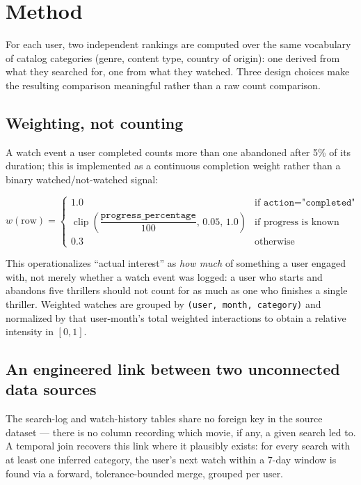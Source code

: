 \documentclass[11pt,a4paper,oneside]{book}
\newcommand{\code}[1]{\texttt{#1}}
\begin{document}
\section{Method}
\label{sec:behavior-method}

For each user, two independent rankings are computed over the same vocabulary of catalog categories
(genre, content type, country of origin): one derived from what they searched for, one from what
they watched. Three design choices make the resulting comparison meaningful rather than a raw
count comparison.

\subsection{Weighting, not counting}

A watch event a user completed counts more than one abandoned after 5\% of its duration; this is
implemented as a continuous completion weight rather than a binary watched/not-watched signal:

\[
w(\text{row}) =
\begin{cases}
1.0 & \text{if } \code{action} = \code{"completed"} \\[4pt]
\operatorname{clip}\!\left(\dfrac{\code{progress\_percentage}}{100},\, 0.05,\, 1.0\right) &
    \text{if progress is known} \\[8pt]
0.3 & \text{otherwise}
\end{cases}
\]

This operationalizes ``actual interest'' as \emph{how much} of something a user engaged with, not
merely whether a watch event was logged: a user who starts and abandons five thrillers should not
count for as much as one who finishes a single thriller. Weighted watches are grouped by
\code{(user, month, category)} and normalized by that user-month's total weighted interactions to
obtain a relative intensity in $[0,1]$.

\subsection{An engineered link between two unconnected data sources}
\label{sec:behavior-link}

The search-log and watch-history tables share no foreign key in the source dataset --- there is no
column recording which movie, if any, a given search led to. A temporal join recovers this link
where it plausibly exists: for every search with at least one inferred category, the user's next
watch within a 7-day window is found via a forward, tolerance-bounded merge, grouped per user.
\end{document}
